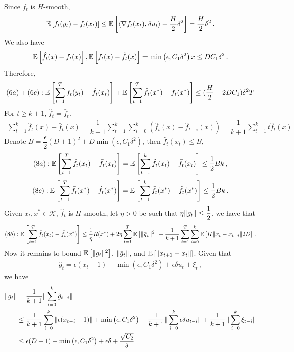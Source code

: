 \documentclass[11pt,letterpaper,english]{article}
\begin{document}
Since $f_t$ is $H$-smooth,
\begin{align*}
\mathbb{E}\left[f_t(y_t)-f_t(x_t)\right] \leq \mathbb{E}\left[ \langle \nabla f_t(x_t), \delta u_t \rangle +\dfrac{H}{2}\delta^2\right]=\dfrac{H}{2}\delta^2 \,.
\end{align*}
We also have
\begin{align*}
\mathbb{E}\left[ \hat{f}_t(x)-f_t(x) \right], \mathbb{E}\left[ f_t(x)-\hat{f}_t(x) \right] = \min\left( \epsilon, C_1\delta^2   \right)x \leq D C_1\delta^2 \,.
\end{align*}
Therefore, 
\begin{align*}
(6a) + (6c) : \mathbb{E}\left[ \sum_{t=1}^T f_t(y_t)-\hat{f}_t(x_t) \right] + \mathbb{E}\left[\sum_{t=1}^T \hat{f}_t(x^*)-{f}_t(x^*)\right] \leq (\dfrac{H}{2}+2D C_1)\delta^2 T
\end{align*}
For $t\geq k+1$, $\hat{f}_t=\bar{f}_t$.
\begin{align*}
\sum_{t=1}^k \hat{f}_t(x)-\bar{f}_t(x) = \dfrac{1}{k+1}\sum_{t=1}^k \sum_{i=0}^k \left( \hat{f}_t(x)-\hat{f}_{t-i}(x) \right)=\dfrac{1}{k+1}\sum_{t=1}^k t \hat{f}_t(x)
\end{align*}
Denote $B = \dfrac{\epsilon}{2}(D+1)^2+D\min\left( \epsilon, C_1\delta^2   \right)$, then $\hat{f}_t(x_t) \leq B$,
\begin{align*}
(8a): \mathbb{E}\left[\sum_{t=1}^T \hat{f}_t(x_t)-\bar{f}_t(x_t) \right] = \mathbb{E}\left[\sum_{t=1}^k \hat{f}_t(x_t)-\bar{f}_t(x_t) \right]  \leq \dfrac{1}{2} Bk \,,
\end{align*}
\begin{align*}
(8c): \mathbb{E}\left[\sum_{t=1}^T \bar{f}_t(x^*)-\hat{f}_t(x^*) \right] = \mathbb{E}\left[\sum_{t=1}^k \bar{f}_t(x^*)-\hat{f}_t(x^*) \right] \leq \dfrac{1}{2} Bk \,.
\end{align*}
Given $x_t, x^* \in \mathcal{K}$, $\hat{f}_t$ is $H$-smooth,  let $\eta>0$ be such that $\eta \|\bar{g}_t\| \leq \dfrac{1}{2}$, we have that
\begin{align*}
(8b): \mathbb{E}\left[\sum_{t=1}^T \bar{f}_t(x_t)-\bar{f}_t(x^*) \right] \leq \dfrac{1}{\eta} R(x^*) + 2\eta \sum_{t=1}^T\mathbb{E}\left[ \|\bar{g}_t\|^2\right] + \dfrac{1}{k+1} \sum_{t=1}^{T}\sum_{i=0}^k \mathbb{E}\left[H \|x_t-x_{t-i}\| 2D \right]\,.
\end{align*}
Now it remains to bound $\mathbb{E}\left[ \|\bar{g}_t\|^2\right]$, $\|\bar{g}_t\|$,   and $\mathbb{E}\left[\|x_{t+1}-x_t\|\right]$.
Given that
\begin{align*}
\hat{g}_t = \epsilon (x_t-1)-\min\left( \epsilon, C_1\delta^2  \right) + \epsilon \delta u_t +\xi_t \,,
\end{align*}
we have
\begin{align*}
\|\bar{g}_t\| &= \dfrac{1}{k+1} \| \sum_{i=0}^k \hat{g}_{t-i} \|\\
&\leq \dfrac{1}{k+1}\sum_{i=0}^k \|\epsilon (x_{t-i}-1)\| + \min\left( \epsilon, C_1\delta^2  \right) +\dfrac{1}{k+1} \|\sum_{i=0}^k \epsilon \delta u_{t-i}  \|+\dfrac{1}{k+1} \|\sum_{i=0}^k \xi_{t-i}  \|\\
&\leq \epsilon (D+1)+\min\left( \epsilon, C_1\delta^2  \right)+\epsilon \delta + \dfrac{\sqrt{C_2}}{\delta}
\end{align*}
\end{document}
